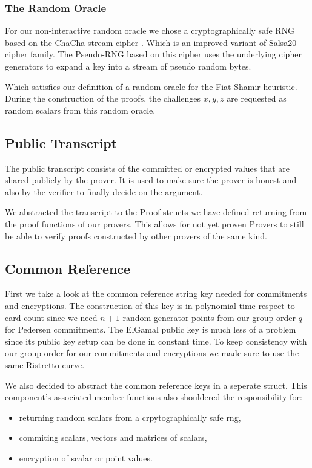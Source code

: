 \documentclass[12pt,a4paper]{report}
\begin{document}
\subsubsection{The Random Oracle}
For our non-interactive random oracle we chose a cryptographically safe RNG based on the ChaCha stream cipher \cite{cha}. 
Which is an improved variant of Salsa20 \cite{salsa} cipher family. 
The Pseudo-RNG based on this cipher uses the underlying cipher generators to expand a key into a stream of pseudo random bytes.\par
Which satisfies our definition of a random oracle for the Fiat-Shamir heuristic. During the construction of the proofs, the challenges $x, y, z$ are requested as random scalars from this random oracle.
\subsection*{Public Transcript}
The public transcript consists of the committed or encrypted values that are shared publicly by the prover. 
It is used to make sure the prover is honest and also by the verifier to finally decide on the argument.\par
We abstracted the transcript to the Proof structs we have defined returning from the proof functions of our provers. This allows for not yet proven Provers to still be able to verify proofs constructed by other provers of the same kind.
\subsection*{Common Reference}
First we take a look at the common reference string key needed for commitments and encryptions. 
The construction of this key is in polynomial time respect to card count since we need $n+1$ random generator points from our group order $q$ for Pedersen commitments. 
The ElGamal public key is much less of a problem since its public key setup can be done in constant time.
To keep consistency with our group order for our commitments and encryptions we made sure to use the same Ristretto curve.\par
We also decided to abstract the common reference keys in a seperate struct. 
This component's associated
member functions also shouldered the responsibility for: 
\begin{itemize}
	\item returning random scalars from a crpytographically safe rng, 
	\item commiting scalars, vectors and matrices of scalars, 
	\item encryption of scalar or point values.
\end{itemize}
\end{document}
